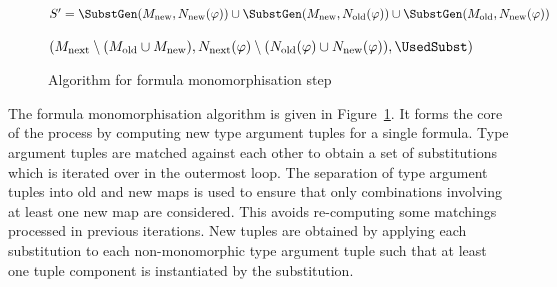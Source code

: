 \documentclass[runningheads]{llncs}
\begin{document}
\begin{figure}[t!]
\begin{algorithm}[H]
{   \Let $S' = \SubstGen(M_{\text{new}}, N_{\text{new}}(\varphi))
   \cup \SubstGen(M_{\text{new}}, N_{\text{old}}(\varphi))
   \cup \SubstGen(M_{\text{old}}, N_{\text{new}}(\varphi))$\;

   \BlankLine

   \Return \((M_{\text{next}}\setminus (M_{\text{old}} \cup M_{\text{new}}), N_{\text{next}}(\varphi)\setminus (N_{\text{old}}(\varphi)\cup N_{\text{new}}(\varphi)), \UsedSubst)\)
}

\end{algorithm}
\caption{Algorithm for formula monomorphisation step}
\label{mono_step}
\end{figure}


The formula monomorphisation algorithm is given in Figure~\ref{mono_step}. It forms the core of the process by computing new type argument tuples for a single formula. Type argument tuples are matched against each other to obtain a set of substitutions which is iterated over in the outermost loop. 
The separation of type argument tuples into old and new maps is used to ensure that only combinations involving at least one new map are considered. This avoids re-computing some matchings processed in previous iterations. %
New tuples are obtained by applying each substitution to each non-monomorphic type argument tuple such that at least one tuple component is instantiated by the substitution.
\end{document}
